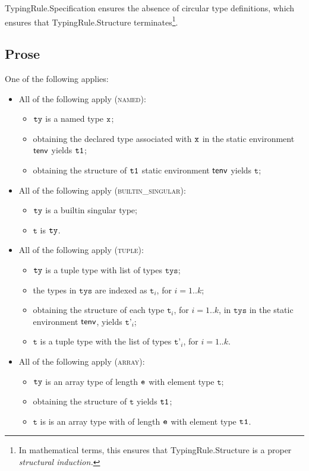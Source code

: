 \documentclass{book}
\newcommand\ProseOrTypeError[0]{\ProseTerminateAs{\TypeErrorConfig}}
\newcommand\vt[0]{\texttt{t}}
\newcommand\vtp[0]{\texttt{t'}}
\newcommand\tys[0]{\texttt{tys}}
\begin{document}
TypingRule.Specification ensures the absence of circular type definitions,
which ensures that TypingRule.Structure terminates\footnote{In mathematical terms,
this ensures that TypingRule.Structure is a proper \emph{structural induction.}}.

\subsection{Prose}
One of the following applies:
\begin{itemize}
\item All of the following apply (\textsc{named}):
  \begin{itemize}
  \item $\texttt{ty}$ is a named type $\texttt{x}$;
  \item obtaining the declared type associated with $\texttt{x}$ in the static environment $\textsf{tenv}$ yields $\texttt{t1}$\ProseOrTypeError;
  \item obtaining the structure of $\texttt{t1}$ static environment $\textsf{tenv}$ yields $\vt$\ProseOrTypeError;
  \end{itemize}
\item All of the following apply (\textsc{builtin\_singular}):
  \begin{itemize}
  \item $\texttt{ty}$ is a builtin singular type;
  \item $\vt$ is $\texttt{ty}$.
  \end{itemize}
\item All of the following apply (\textsc{tuple}):
  \begin{itemize}
  \item $\texttt{ty}$ is a tuple type with list of types $\tys$;
  \item the types in $\tys$ are indexed as $\vt_i$, for $i=1..k$;
  \item obtaining the structure of each type $\vt_i$, for $i=1..k$, in $\tys$ in the static environment $\textsf{tenv}$,
  yields $\vtp_i$\ProseOrTypeError;
  \item $\vt$ is a tuple type with the list of types $\vtp_i$, for $i=1..k$.
  \end{itemize}
\item All of the following apply (\textsc{array}):
  \begin{itemize}
    \item $\texttt{ty}$ is an array type of length $\texttt{e}$ with element type $\vt$;
    \item obtaining the structure of $\vt$ yields $\texttt{t1}$\ProseOrTypeError;
    \item $\vt$ is is an array type with of length $\texttt{e}$ with element type $\texttt{t1}$.

\end{itemize}
\end{itemize}
\end{document}
